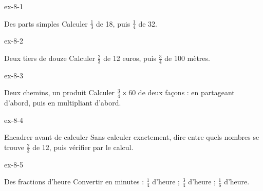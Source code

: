 \clearpage{}
\begin{blocLivre}{ex-8-1}\begin{exercice}[1]{Des parts simples}
Calculer $\frac13$ de 18, puis $\frac14$ de 32.
\end{exercice}\end{blocLivre}
\begin{blocLivre}{ex-8-2}\begin{exercice}[1]{Deux tiers de douze}
Calculer $\frac23$ de 12 euros, puis $\frac34$ de 100 mètres.
\end{exercice}\end{blocLivre}
\begin{blocLivre}{ex-8-3}\begin{exercice}[1]{Deux chemins, un produit}
Calculer $\frac34\times60$ de deux façons : en partageant d’abord, puis en multipliant d’abord.
\end{exercice}\end{blocLivre}
\begin{blocLivre}{ex-8-4}\begin{exercice}[1]{Encadrer avant de calculer}
Sans calculer exactement, dire entre quels nombres se trouve $\frac23$ de 12, puis vérifier par le calcul.
\end{exercice}\end{blocLivre}
\begin{blocLivre}{ex-8-5}\begin{exercice}[1]{Des fractions d’heure}
Convertir en minutes : $\frac14$ d’heure ; $\frac34$ d’heure ; $\frac1{6}$ d’heure.
\end{exercice}\end{blocLivre}


